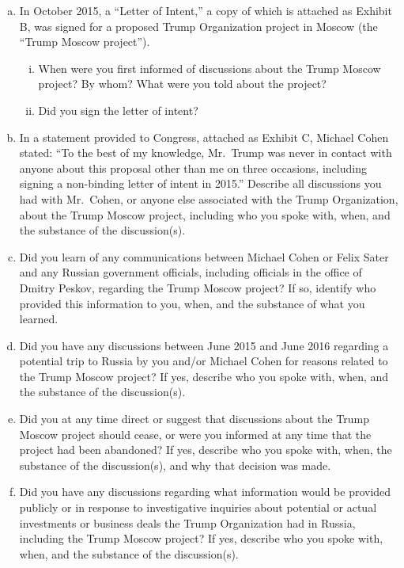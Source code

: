 \begin{enumerate}[a.]

\item In October 2015, a “Letter of Intent,” a copy of which is attached as Exhibit B, was signed for a proposed Trump Organization project in Moscow (the “Trump Moscow project”).

\begin{enumerate}[i.]

\item When were you first informed of discussions about the Trump Moscow project?
By whom?
What were you told about the project?

\item Did you sign the letter of intent?

\end{enumerate}

\item In a statement provided to Congress, attached as Exhibit C, Michael Cohen stated: “To the best of my knowledge, Mr.~Trump was never in contact with anyone about this proposal other than me on three occasions, including signing a non-binding letter of intent in 2015.”
Describe all discussions you had with Mr.~Cohen, or anyone else associated with the Trump Organization, about the Trump Moscow project, including who you spoke with, when, and the substance of the discussion(s).

\item Did you learn of any communications between Michael Cohen or Felix Sater and any Russian government officials, including officials in the office of Dmitry Peskov, regarding the Trump Moscow project?
If so, identify who provided this information to you, when, and the substance of what you learned.

\item Did you have any discussions between June 2015 and June 2016 regarding a potential trip to Russia by you and/or Michael Cohen for reasons related to the Trump Moscow project?
If yes, describe who you spoke with, when, and the substance of the discussion(s).

\item Did you at any time direct or suggest that discussions about the Trump Moscow project should cease, or were you informed at any time that the project had been abandoned?
If yes, describe who you spoke with, when, the substance of the discussion(s), and why that decision was made.

\item Did you have any discussions regarding what information would be provided publicly or in response to investigative inquiries about potential or actual investments or business deals the Trump Organization had in Russia, including the Trump Moscow project?
If yes, describe who you spoke with, when, and the substance of the discussion(s).


\end{enumerate}
